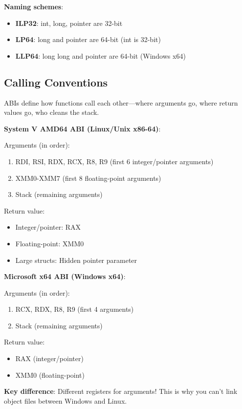 \textbf{Naming schemes}:
\begin{itemize}
    \item \textbf{ILP32}: int, long, pointer are 32-bit
    \item \textbf{LP64}: long and pointer are 64-bit (int is 32-bit)
    \item \textbf{LLP64}: long long and pointer are 64-bit (Windows x64)
\end{itemize}

\subsection{Calling Conventions}

ABIs define how functions call each other—where arguments go, where return values go, who cleans the stack.

\textbf{System V AMD64 ABI (Linux/Unix x86-64)}:

Arguments (in order):
\begin{enumerate}
    \item RDI, RSI, RDX, RCX, R8, R9 (first 6 integer/pointer arguments)
    \item XMM0-XMM7 (first 8 floating-point arguments)
    \item Stack (remaining arguments)
\end{enumerate}

Return value:
\begin{itemize}
    \item Integer/pointer: RAX
    \item Floating-point: XMM0
    \item Large structs: Hidden pointer parameter
\end{itemize}

\textbf{Microsoft x64 ABI (Windows x64)}:

Arguments (in order):
\begin{enumerate}
    \item RCX, RDX, R8, R9 (first 4 arguments)
    \item Stack (remaining arguments)
\end{enumerate}

Return value:
\begin{itemize}
    \item RAX (integer/pointer)
    \item XMM0 (floating-point)
\end{itemize}

\textbf{Key difference}: Different registers for arguments! This is why you can't link object files between Windows and Linux.

